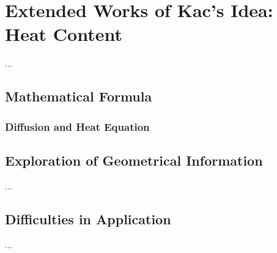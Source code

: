 \section{Extended Works of Kac's Idea: Heat Content}\label{traditinal_heat_content}

...


\subsection{Mathematical Formula}

\subsubsection{Diffusion and Heat Equation}
\subsubsection{}


\subsection{Exploration of Geometrical Information}


...


\subsection{Difficulties in Application}


...






